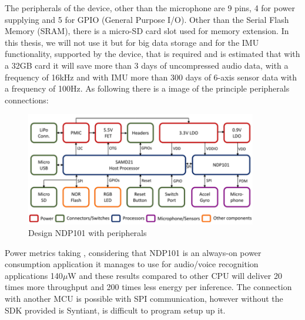 The peripherals of the device, other than the microphone are 9 pins, 4 for power supplying and 5 for GPIO (General Purpose I/O). Other than the Serial Flash Memory (SRAM), there is a micro-SD card slot used for memory extension. In this thesis, we will not use it but for big data storage and for the IMU functionality, supported by the device, that is required and is estimated that with a 32GB card it will save more than 3 days of uncompressed audio data, with a frequency of 16kHz and with IMU more than 300 days of 6-axis sensor data with a frequency of 100Hz. As following there is a image of the principle peripherals connections:
\begin{figure}[!h]
    \centering
        \includegraphics[width=0.9\textwidth]{images/2.02 Design with peripherals.png}
        \caption{Design NDP101 with peripherals}
\end{figure}
\newpage
Power metrics taking \cite{analysis_syntiant_performances}, considering that NDP101 is an always-on power consumption application it manages to use for audio/voice recognition applications 140$\mu$W and these results compared to other CPU will deliver 20 times more throughput and 200 times less energy per inference. The connection with another MCU is possible with SPI communication, however without the SDK provided is Syntiant, is difficult to program setup up it.

